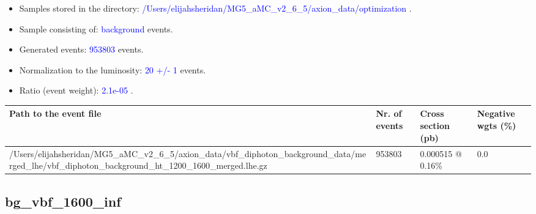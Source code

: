 \documentclass[a4paper, 10pt]{article}
\begin{document}
\begin{itemize}
  \item Samples stored in the directory: \textcolor{blue}{/\-Users/\-elijahsheridan/\-MG5\_aMC\_v2\_6\_5/\-axion\_data/\-optimization} .
   \item Sample consisting of: \textcolor{blue}{background}  events.
   \item Generated events: \textcolor{blue}{953803 }  events.
   \item Normalization to the luminosity: \textcolor{blue}{20}\textcolor{blue}{ +/\-- }\textcolor{blue}{1 }  events.
   \item Ratio (event weight): \textcolor{blue}{2.1e-05 } .  
 
\end{itemize}
\begin{table}[H]
  \begin{center}
    \begin{tabular}{|m{55.0mm}|m{25.0mm}|m{30.0mm}|m{30.0mm}|}
      \hline
      {\cellcolor{yellow}         Path to the event file}& {\cellcolor{yellow}         Nr. of events}& {\cellcolor{yellow}         Cross section (pb)}& {\cellcolor{yellow}         Negative wgts (\%)}\\
      \hline
      {\cellcolor{white}          /\-Users/\-elijahsheridan/\-MG5\_aMC\_v2\_6\_5/\-axion\_data/\-vbf\_diphoton\_background\_data/\-merged\_lhe/\-vbf\_diphoton\_background\_ht\_1200\_1600\_merged.lhe.gz}& {\cellcolor{white}          953803}& {\cellcolor{white}          0.000515 @ 0.16\%}& {\cellcolor{white}          0.0}\\
\hline
    \end{tabular}
  \end{center}
\end{table}

\subsection{ bg\_vbf\_1600\_inf}
\end{document}
